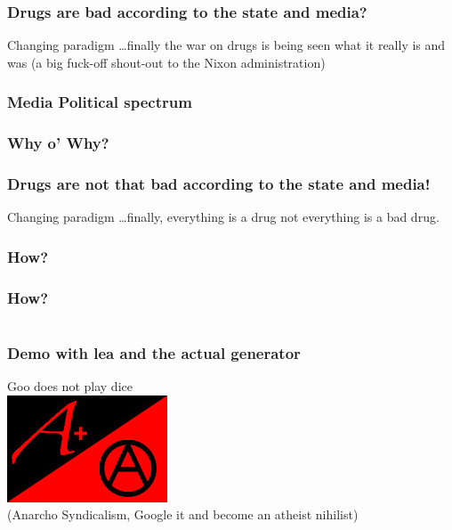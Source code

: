 \documentclass[a4paper]{beamer}
\begin{document}

\begin{frame}
\frametitle{Drugs are bad according to the state and media?}
Changing paradigm \ldots finally the war on drugs is being seen what it really is and was (a big fuck-off shout-out to the Nixon administration)
\end{frame}


\begin{frame}
\frametitle{Media Political spectrum}
\end{frame}

\begin{frame}
\frametitle{Why o' Why?}
\end{frame}

\begin{frame}
\frametitle{Drugs are not that bad according to the state and media!}
Changing paradigm \ldots finally, everything is a drug not everything is a bad drug.
\end{frame}

\begin{frame}
\frametitle{How?}
\end{frame}

\begin{frame}
\frametitle{How?}
\inputminted[firstline=1, lastline=6, gobble=0, linenos, mathescape, bgcolor=bg, numbersep=8pt, frame=lines, framesep=3mm, fontsize=\scriptsize]{python}{code/bh.py}
\end{frame}

\begin{frame}
\frametitle{Demo with lea and the actual generator}
Goo does not play dice
\\
\includegraphics[scale=0.60]{img/mjr_anarchist_flag.jpg}
\\
(Anarcho Syndicalism, Google it and become an atheist nihilist)
\end{frame}
\end{document}
